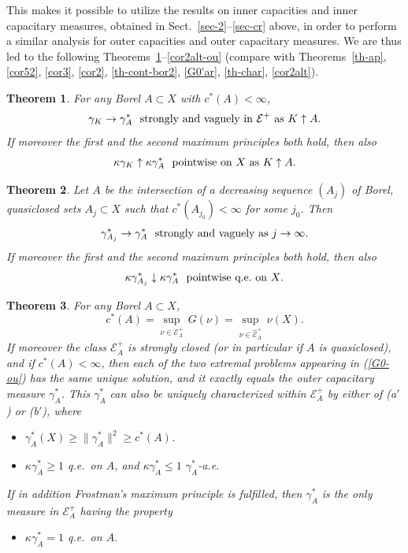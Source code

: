 \documentclass[12pt,a4paper,reqno]{amsart} %
\theoremstyle{lause}
\theoremstyle{maaritelma}
\theoremstyle{lause}
\newtheorem{theorem}{Theorem}[section]
\theoremstyle{maaritelma}
\numberwithin{equation}{section}
\begin{document}
This makes it possible to utilize the results on inner capacities and inner capacitary measures, obtained in Sect.~\ref{sec-2}--\ref{sec-cr} above, in order to perform a similar analysis for outer capacities and outer capacitary measures. We are thus led to the following Theorems~\ref{cor2-ou}--\ref{cor2alt-ou} (compare with Theorems~\ref{th-ap}, \ref{cor52}, \ref{cor3}, \ref{cor2}, \ref{th-cont-bor2}, \ref{G0'ar},  \ref{th-char}, \ref{cor2alt}).

\begin{theorem}\label{cor2-ou}For any Borel\/ $A\subset X$ with\/ $c^*(A)<\infty$,
\[\gamma_K\to\gamma_A^*\text{ \ strongly and vaguely in\/ $\mathcal E^+$ as\/ $K\uparrow A$.}\]
If moreover the first and the second maximum principles both hold, then also
\[\kappa\gamma_K\uparrow\kappa\gamma_A^*\text{ \ pointwise on\/ $X$ as\/ $K\uparrow A$.}\]
\end{theorem}

\begin{theorem}\label{th-cont-bor2-ou}Let\/ $A$ be the intersection of a decreasing sequence\/ $(A_j)$ of Borel, quasiclosed sets\/ $A_j\subset X$ such that\/
$c^*(A_{j_0})<\infty$ for some\/ $j_0$. Then
\[\gamma^*_{A_j}\to\gamma^*_A\text{ \ strongly and vaguely as\/ $j\to\infty$}.\]
If moreover the first and the second maximum principles both hold, then also
\[\kappa\gamma^*_{A_j}\downarrow\kappa\gamma^*_A\text{ \ pointwise q.e.\ on\/ $X$}.\]
\end{theorem}

\begin{theorem}\label{G0'-ou} For any Borel\/ $A\subset X$,
\begin{equation}\label{G0-ou}c^*(A)=\sup_{\nu\in\mathcal E^+_A}\,G(\nu)=
\sup_{\nu\in\widehat{\mathcal E}^+_A}\,\nu(X).\end{equation}
If moreover the class\/ $\mathcal E^+_A$ is strongly closed\/ {\rm(}or in particular if\/ $A$ is quasiclosed\/{\rm)}, and if\/ $c^*(A)<\infty$, then each of the two extremal problems appearing in\/ {\rm(\ref{G0-ou})} has the same unique solution, and it exactly equals the outer capacitary measure\/ $\gamma_A^*$.
This\/ $\gamma_A^*$ can also be uniquely characterized within\/ $\mathcal E^+_A$ by either of\/ {\rm(a$'$)} or\/ {\rm(b$'$)}, where
\begin{itemize}
\item[{\rm(a$'$)}] $\gamma_A^*(X)\geqslant\|\gamma_A^*\|^2\geqslant c^*(A)$.
\item[{\rm(b$'$)}] $\kappa\gamma_A^*\geqslant1$ q.e.\ on $A$, and\/ $\kappa\gamma_A^*\leqslant1$ $\gamma_A^*$-a.e.
\end{itemize}
If in addition Frostman's maximum principle is fulfilled, then\/ $\gamma_A^*$ is the only measure in\/ $\mathcal E^+_A$ having the property
\begin{itemize}
\item[{\rm(c$'$)}] $\kappa\gamma_A^*=1$ q.e.\ on\/ $A$.
\end{itemize}
\end{theorem}
\end{document}
